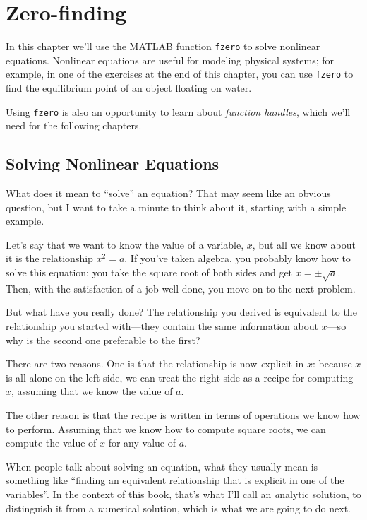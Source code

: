 \chapter{Zero-finding}
\minitoc{}

In this chapter we'll use the MATLAB function {\tt fzero} to solve nonlinear equations.
Nonlinear equations are useful for modeling physical systems; for example, in one of
the exercises at the end of this chapter, you can use {\tt fzero} to find the equilibrium point of an object floating on water.

Using {\tt fzero} is also an opportunity to learn about {\em function handles}, which we'll need for the following chapters.

\section{Solving Nonlinear Equations}


What does it mean to ``solve'' an equation?  That may seem like an
obvious question, but I want to take a minute to think about it,
starting with a simple example.

Let's say that we want to know the
value of a variable, $x$, but all we know about it is the relationship
$x^2 = a$. If you've taken algebra, you probably know how to solve this
equation: you take the square root of both sides and get
$x = \pm \sqrt{a}$.  Then, with the satisfaction of a job well done,
you move on to the next problem.


But what have you really done?  The relationship you derived is
equivalent to the relationship you started with---they contain the
same information about $x$---so why is the second one preferable
to the first?

There are two reasons.  One is that the relationship is now {\emph explicit}
in $x$: because $x$ is all alone on the left side, we can treat
the right side as a recipe for computing $x$, assuming that we
know the value of $a$.


The other reason is that the recipe is written in terms of operations
we know how to perform.  Assuming that we know how to compute square
roots, we can compute the value of $x$ for any value of $a$.

When people talk about solving an equation, what they usually mean
is something like ``finding an equivalent relationship that is
explicit in one of the variables''.  In the context of this book,
that's what I'll call an {\emph analytic solution}, to distinguish
it from a {\emph numerical solution}, which is what we are going to
do next.

